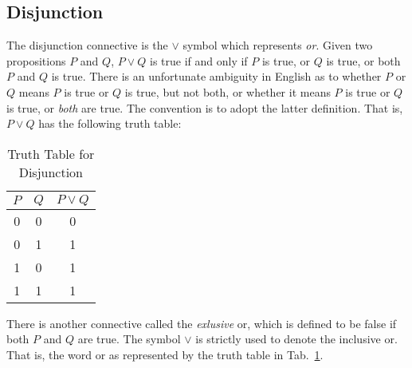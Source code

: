     \subsection{Disjunction}
        The disjunction connective is the $\lor$ symbol which represents
        \textit{or}. Given two propositions $P$ and $Q$, $P\lor{Q}$ is true if
        and only if $P$ is true, or $Q$ is true, or both $P$ and $Q$ is true.
        There is an unfortunate ambiguity in English as to whether $P$ or $Q$
        means $P$ is true or $Q$ is true, but not both, or whether it means
        $P$ is true or $Q$ is true, or \textit{both} are true. The convention is
        to adopt the latter definition. That is, $P\lor{Q}$ has the following
        truth table:
        \begin{table}[H]
            \centering
            \captionsetup{type=table}
            \begin{tabular}{ccc}
                $P$&$Q$&$P\lor{Q}$\\
                \hline
                0&0&0\\
                0&1&1\\
                1&0&1\\
                1&1&1
            \end{tabular}
            \caption{Truth Table for Disjunction}
            \label{tab:Truth_Table_for_Disjunction}
        \end{table}
        There is another connective called the \textit{exlusive} or, which is
        defined to be false if both $P$ and $Q$ are true. The symbol $\lor$ is
        strictly used to denote the inclusive or. That is, the word or as
        represented by the truth table in
        Tab.~\ref{tab:Truth_Table_for_Disjunction}.
